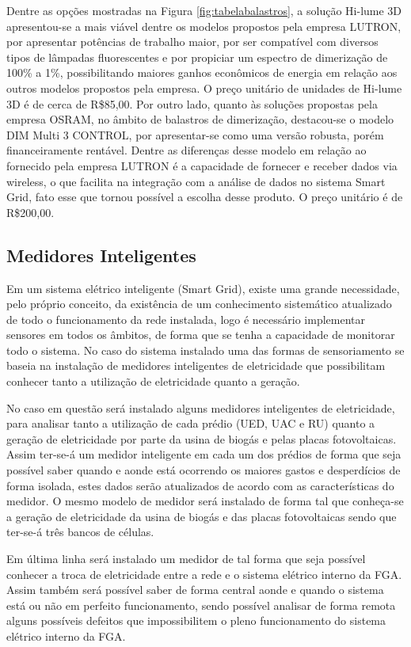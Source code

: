 Dentre as opções mostradas na Figura \ref{fig:tabelabalastros}, a solução Hi-lume 3D apresentou-se a mais viável dentre os modelos propostos pela empresa LUTRON, por apresentar potências de trabalho maior, por ser compatível com diversos tipos de lâmpadas fluorescentes e por propiciar um espectro de dimerização de 100\% a 1\%, possibilitando maiores ganhos econômicos de energia em relação aos outros modelos propostos pela empresa. O preço unitário de unidades de Hi-lume 3D é de cerca de R\$85,00. Por outro lado, quanto às soluções propostas pela empresa OSRAM, no âmbito de balastros de dimerização, destacou-se o modelo DIM Multi 3 CONTROL, por apresentar-se como uma versão robusta, porém financeiramente rentável. Dentre as diferenças desse modelo em relação ao fornecido pela empresa LUTRON é a capacidade de fornecer e receber dados via wireless, o que facilita na integração com a análise de dados no sistema Smart Grid, fato esse que tornou possível a escolha desse produto. O preço unitário é de R\$200,00.

\subsection{Medidores Inteligentes} 
Em um sistema elétrico inteligente (Smart Grid), existe uma grande necessidade, pelo próprio conceito, da existência de um conhecimento sistemático atualizado de todo o funcionamento da rede instalada, logo é necessário implementar sensores em todos os âmbitos, de forma que se tenha a capacidade de monitorar todo o sistema. No caso do sistema instalado uma das formas de sensoriamento se baseia na instalação de medidores inteligentes de eletricidade que possibilitam conhecer tanto a utilização de eletricidade quanto a geração.

No caso em questão será instalado alguns medidores inteligentes de eletricidade, para analisar tanto a utilização de cada prédio (UED, UAC e RU) quanto a geração de eletricidade por parte da usina de biogás e pelas placas fotovoltaicas. Assim ter-se-á um medidor inteligente em cada um dos prédios de forma que seja possível saber quando e aonde está ocorrendo os maiores gastos e desperdícios de forma isolada, estes dados serão atualizados de acordo com as características do medidor. O mesmo modelo de medidor será instalado de forma tal que conheça-se a geração de eletricidade da usina de biogás e das placas fotovoltaicas sendo que ter-se-á três bancos de células.

Em última linha será instalado um medidor de tal forma que seja possível conhecer a troca de eletricidade entre a rede e o sistema elétrico interno da FGA. Assim também será possível saber de forma central aonde e quando o sistema está ou não em perfeito funcionamento, sendo possível analisar de forma remota alguns possíveis defeitos que impossibilitem o pleno funcionamento do sistema elétrico interno da FGA.

